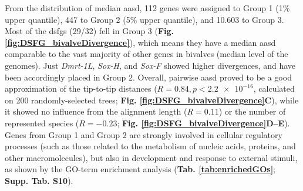 \documentclass[../main.tex]{subfiles}
\begin{document}
From the distribution of median \gls{aasd}, 112 genes were assigned to Group 1 (1\% upper quantile), 447 to Group 2 (5\% upper quantile), and 10.603 to Group 3. Most of the \glspl{dsfg} (29/32) fell in Group 3 (\textbf{Fig. \ref{fig:DSFG_bivalveDivergence}}), which means they have a median \gls{aasd} comparable to the vast majority of other genes in bivalves (median level of the genomes). Just \textit{Dmrt-1L}, \textit{Sox-H}, and \textit{Sox-F} showed higher divergences, and have been accordingly placed in Group 2. Overall, pairwise \gls{aasd} proved to be a good approximation of the tip-to-tip distances ($R = 0.84, p < \num{2.2e-16}$, calculated on 200 randomly-selected trees; \textbf{Fig. \ref{fig:DSFG_bivalveDivergence}C}), while it showed no influence from the alignment length ($R = 0.11$) or the number of represented species ($R = -0.23$; \textbf{Fig. \ref{fig:DSFG_bivalveDivergence}D--E}). Genes from Group 1 and Group 2 are strongly involved in cellular regulatory processes (such as those related to the metabolism of nucleic acids, proteins, and other macromolecules), but also in development and response to external stimuli, as shown by the GO-term enrichment analysis (\textbf{Tab. \ref{tab:enrichedGOs}}; \textbf{Supp. Tab. S10}).
\end{document}
